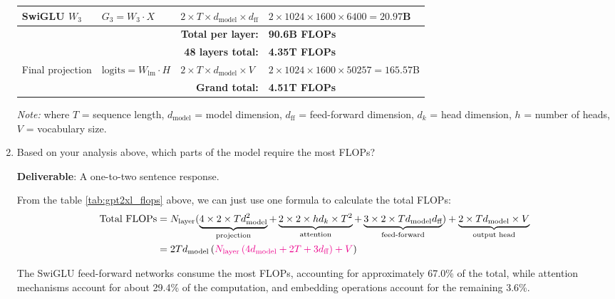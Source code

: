 \begin{enumerate}[label=(\alph*)]
\begin{table}[h]
{\begin{tabular}{llll}
    SwiGLU $W_3$ & $G_3 = W_3 \cdot X$ & $2 \times T \times d_{\text{model}} \times d_{\text{ff}}$ & $2 \times 1024 \times 1600 \times 6400 = 20.97$B \\
    \midrule
    \multicolumn{3}{r}{\textbf{Total per layer:}} & \textbf{90.6B FLOPs} \\
    \multicolumn{3}{r}{\textbf{48 layers total:}} & \textbf{4.35T FLOPs} \\
    \midrule
    Final projection & $\text{logits} = W_{\text{lm}} \cdot H$ & $2 \times T \times d_{\text{model}} \times V$ & $2 \times 1024 \times 1600 \times 50257 = 165.57$B \\
    \midrule
    \multicolumn{3}{r}{\textbf{Grand total:}} & \textbf{4.51T FLOPs} \\
    \bottomrule
    \end{tabular}
    }
    \end{table}
    {\small\textit{Note:} where $T$ = sequence length, $d_{\text{model}}$ = model dimension, $d_{\text{ff}}$ = feed-forward dimension, $d_k$ = head dimension, $h$ = number of heads, $V$ = vocabulary size.}
    
    \item Based on your analysis above, which parts of the model require the most FLOPs?
    
    \textbf{Deliverable}: A one-to-two sentence response.
    
    \begin{answer}
    From the table \ref{tab:gpt2xl_flops} above, we can just use one formula to calculate the total FLOPs:
    \begin{equation*}
        \begin{aligned}
            \text{Total FLOPs} &= N_{\text{layer}} (
                \underbrace{4 \times 2 \times T d_{\text{model}}^2}_{\text{projection}} + 
                \underbrace{2 \times 2 \times h d_{k} \times T^2}_{\text{attention}} + 
                \underbrace{3 \times 2 \times T d_{\text{model}} d_{\text{ff}}}_{\text{feed-forward}}) + \underbrace{2 \times T d_{\text{model}} \times V}_{\text{output head}} \\
            &= 2 T d_{\text{model}} \left(
                {\color{magenta}N_{\text{layer}}  \left(
                    4 d_{\text{model}} + 2 T + 3 d_{\text{ff}}
                \right) + V}
            \right)
        \end{aligned}
    \end{equation*}

    The SwiGLU feed-forward networks consume the most FLOPs, accounting for approximately 67.0\% of the total, while attention mechanisms account for about 29.4\% of the computation, and embedding operations account for the remaining 3.6\%.
    \end{answer}
    

\end{enumerate}
